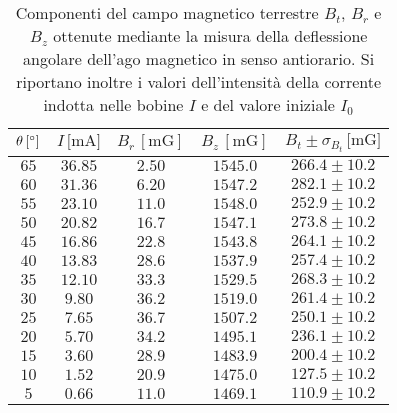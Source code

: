 \documentclass[]{article}
\begin{document}
\begin{table}
    \centering

\begin{tabular}{||c|c|c|c|c||}
    \hline
    $\theta\, [\text{\degree}] $ & $I\, \text{[mA]} $ & $B_r\, [\text{mG}] $ & $B_z\, [\text{mG}] $ & $B_t \pm \sigma_{B_t}\, \text{[mG]} $\\
    \hline\hline

    $65$ & $36.85$ & $2.50$ & $1545.0$ & $266.4 \pm 10.2$ \\\hline
    $60$ & $31.36$ & $6.20$ & $1547.2$ & $282.1 \pm 10.2$ \\\hline
    $55$ & $23.10$ & $11.0$ & $1548.0$ & $252.9 \pm 10.2$ \\\hline
    $50$ & $20.82$ & $16.7$ & $1547.1$ & $273.8 \pm 10.2$ \\\hline
    $45$ & $16.86$ & $22.8$ & $1543.8$ & $264.1 \pm 10.2$ \\\hline
    $40$ & $13.83$ & $28.6$ & $1537.9$ & $257.4 \pm 10.2$ \\\hline
    $35$ & $12.10$ & $33.3$ & $1529.5$ & $268.3 \pm 10.2$ \\\hline
    $30$ & $ 9.80$ & $36.2$ & $1519.0$ & $261.4 \pm 10.2$ \\\hline
    $25$ & $ 7.65$ & $36.7$ & $1507.2$ & $250.1 \pm 10.2$ \\\hline
    $20$ & $ 5.70$ & $34.2$ & $1495.1$ & $236.1 \pm 10.2$ \\\hline
    $15$ & $ 3.60$ & $28.9$ & $1483.9$ & $200.4 \pm 10.2$ \\\hline
    $10$ & $ 1.52$ & $20.9$ & $1475.0$ & $127.5 \pm 10.2$ \\\hline
    $5 $ & $ 0.66$ & $11.0$ & $1469.1$ & $110.9 \pm 10.2$ \\\hline

\end{tabular}
\caption{Componenti del campo magnetico terrestre $B_t$, $B_r$ e $B_z$ ottenute mediante la misura della deflessione angolare dell'ago magnetico in senso antiorario. Si riportano inoltre i valori dell'intensità della corrente indotta nelle bobine $I$ e del valore iniziale $I_0$}
\label{campomagneticoterrestre_sensoantiorario}
\end{table}
\end{document}
